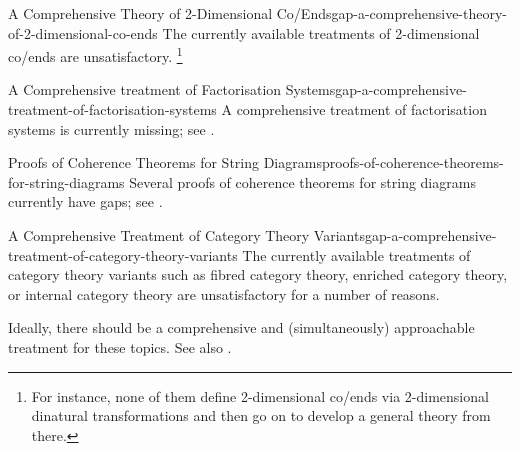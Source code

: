 \begin{gap}{A Comprehensive Theory of 2-Dimensional Co/Ends}{gap-a-comprehensive-theory-of-2-dimensional-co-ends}%
    The currently available treatments of 2-dimensional co/ends are unsatisfactory.%
    \footnote{%
        For instance, none of them define 2-dimensional co/ends via 2-dimensional dinatural transformations and then go on to develop a general theory from there.
        \par\vspace*{\TCBBoxCorrection}
    }%
\end{gap}
\begin{gap}{A Comprehensive treatment of Factorisation Systems}{gap-a-comprehensive-treatment-of-factorisation-systems}%
    A comprehensive treatment of factorisation systems is currently missing; see \cite{MO495003}.
\end{gap}
\begin{gap}{Proofs of Coherence Theorems for String Diagrams}{proofs-of-coherence-theorems-for-string-diagrams}%
    Several proofs of coherence theorems for string diagrams currently have gaps; see \cite{MO497309}.
\end{gap}
\begin{gap}{A Comprehensive Treatment of Category Theory Variants}{gap-a-comprehensive-treatment-of-category-theory-variants}%
    The currently available treatments of category theory variants such as fibred category theory, enriched category theory, or internal category theory are unsatisfactory for a number of reasons.

    \indent Ideally, there should be a comprehensive and (simultaneously) approachable treatment for these topics. See also \cite{MO497419}.
\end{gap}
\begin{appendices}

\end{appendices}

